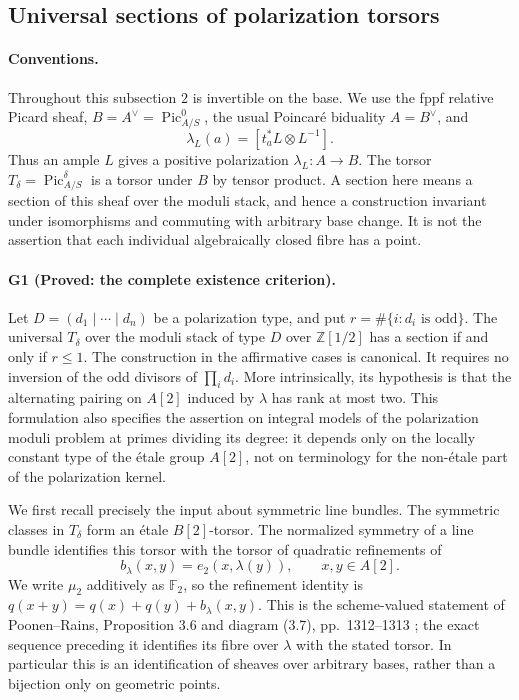 \subsection{Universal sections of polarization torsors}
\paragraph{Conventions.}
Throughout this subsection $2$ is invertible on the base.  We use the
fppf relative Picard sheaf, $B=A^\vee=\operatorname{Pic}^0_{A/S}$,
the usual Poincaré biduality $A=B^\vee$, and
\[
 \lambda_L(a)=[t_a^*L\otimes L^{-1}].
\]
Thus an ample $L$ gives a positive polarization $\lambda_L:A\to B$.
The torsor $T_\delta=\operatorname{Pic}^{\delta}_{A/S}$ is a torsor under
$B$ by tensor product.  A section here means a section of this sheaf
over the moduli stack, and hence a construction invariant under
isomorphisms and commuting with arbitrary base change.  It is not the
assertion that each individual algebraically closed fibre has a point.

\paragraph{G1 (Proved: the complete existence criterion).}
Let $D=(d_1\mid\cdots\mid d_n)$ be a polarization type, and put
$r=\#\{i: d_i\text{ is odd}\}$.  The universal $T_\delta$ over the
moduli stack of type $D$ over $\mathbb Z[1/2]$ has a section if and only
if $r\leq1$.  The construction in the affirmative cases is canonical.
It requires no inversion of the odd divisors of $\prod_i d_i$.
More intrinsically, its hypothesis is that the alternating pairing
on $A[2]$ induced by $\lambda$ has rank at most two.  This formulation
also specifies the assertion on integral models of the polarization
moduli problem at primes dividing its degree: it depends only on the
locally constant type of the étale group $A[2]$, not on terminology for
the non-étale part of the polarization kernel.

We first recall precisely the input about symmetric line bundles.
The symmetric classes in $T_\delta$ form an étale $B[2]$-torsor.  The
normalized symmetry of a line bundle identifies this torsor with the
torsor of quadratic refinements of
\[
 b_\lambda(x,y)=e_2(x,\lambda(y)),\qquad x,y\in A[2].
\]
We write $\mu_2$ additively as $\mathbb F_2$, so the refinement identity
is $q(x+y)=q(x)+q(y)+b_\lambda(x,y)$.  This is the scheme-valued
statement of Poonen--Rains, Proposition 3.6 and diagram (3.7),
pp.~1312--1313 \cite{DGJ_PoonenRains2011}; the exact sequence preceding
it identifies its fibre over $\lambda$ with the stated torsor.
In particular this is an identification of sheaves over arbitrary
bases, rather than a bijection only on geometric points.

